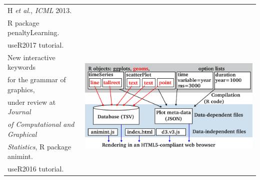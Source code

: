 \documentclass{beamer}
\begin{document}
\begin{frame}
\begin{tabular}{ll}
H {\it et al.}, {\it ICML} 2013. \\
R package penaltyLearning.\\
useR2017 tutorial.\\
\hline
New interactive keywords& \multirow{5}{*}{
\includegraphics[height=0.2\textheight]{figure-design}
}\\
for the grammar of graphics,\\
under review at \emph{Journal}\\
\emph{of Computational and Graphical}\\
\emph{Statistics}, R package animint.\\
useR2016 tutorial.\\
  \end{tabular}

\end{frame}
\end{document}
